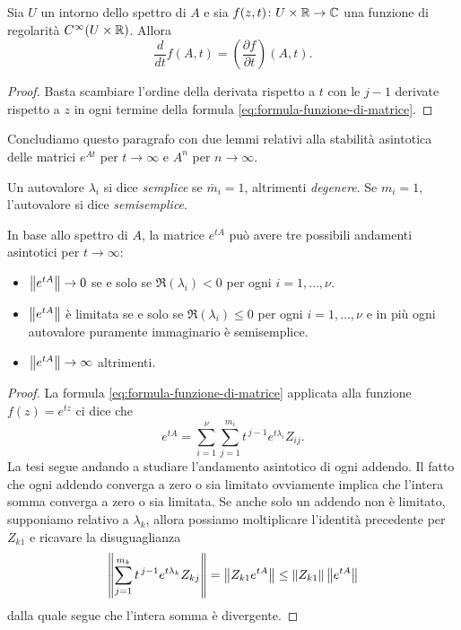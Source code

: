 \begin{teor} \label{teor:funzione-di-matrice-derivata}
Sia $U$ un intorno dello spettro di $A$ e sia $f(z,t) \colon U \times \mathbb{R} \to \mathbb{C}$
una funzione di regolarità $C^\infty(U \times \mathbb{R})$. Allora
\[
\frac{d}{dt} f(A,t) = \left( \frac{\partial f}{\partial t} \right) \! (A,t).
\]
\end{teor}

\begin{proof}
Basta scambiare l'ordine della derivata rispetto a $t$ con le $j-1$ derivate rispetto
a $z$ in ogni termine della formula \eqref{eq:formula-funzione-di-matrice}.
\end{proof}

Concludiamo questo paragrafo con due lemmi relativi alla stabilità asintotica
delle matrici $e^{At}$ per $t \to \infty$ e $A^n$ per $n \to \infty$.

\begin{defi}
Un autovalore $\lambda_i$ si dice \emph{semplice} se $\bar{m}_i = 1$,
altrimenti \emph{degenere}. Se $m_i = 1$, l'autovalore si dice \emph{semisemplice}.
\end{defi}

\begin{teor} \label{teor:andamento-asintotico-esponenziale-matrice}
In base allo spettro di $A$, la matrice $e^{tA}$ può avere tre possibili
andamenti asintotici per $t \to \infty$:
\begin{itemize}
\item $\left\lVert e^{tA}\right\rVert \to 0$ se e solo se $\Re(\lambda_i) < 0$ per ogni
	$i = 1,\dots,\nu$.
\item $\left\lVert e^{tA}\right\rVert$ è limitata se e solo se $\Re(\lambda_i) \leq 0$ per ogni
	$i = 1,\dots,\nu$ e in più ogni autovalore puramente immaginario è semisemplice.
\item $\left\lVert e^{tA}\right\rVert \to \infty$ altrimenti.
\end{itemize}
\end{teor}

\begin{proof}
La formula \eqref{eq:formula-funzione-di-matrice} applicata alla funzione
$f(z) = e^{tz}$ ci dice che
\[
e^{tA} = \sum_{i=1}^\nu \sum_{j=1}^{m_i} t^{\,j-1} e^{t \lambda_i} Z_{ij}.
\]
La tesi segue andando a studiare l'andamento asintotico di ogni addendo.
Il fatto che ogni addendo converga a zero o sia limitato ovviamente implica
che l'intera somma converga a zero o sia limitata. Se anche solo un addendo
non è limitato, supponiamo relativo a $\lambda_k$, allora possiamo moltiplicare
l'identità precedente per $Z_{k1}$ e ricavare la disuguaglianza
\[
\left\lVert\sum_{j=1}^{m_k} t^{\,j-1} e^{t \lambda_k} Z_{kj}\right\rVert
= \left\lVert Z_{k1}e^{tA}\right\rVert
\leq \left\lVert Z_{k1}\right\rVert \left\lVert e^{tA}\right\rVert
\]
dalla quale segue che l'intera somma è divergente.
\end{proof}

